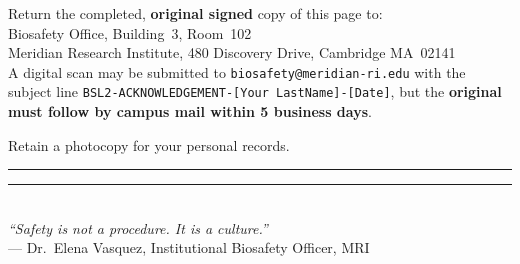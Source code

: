 \vspace{12pt}
\begin{infobox}
\small
Return the completed, \textbf{original signed} copy of this page to:\\
\medskip
\hspace{1em} Biosafety Office, Building~3, Room~102\\
\hspace{1em} Meridian Research Institute, 480 Discovery Drive, Cambridge MA~02141\\
\medskip
A digital scan may be submitted to \texttt{biosafety@meridian-ri.edu} with the
subject line \texttt{BSL2-ACKNOWLEDGEMENT-[Your LastName]-[Date]}, but the
\textbf{original must follow by campus mail within 5 business days}.

Retain a photocopy for your personal records.
\end{infobox}

\vspace{14pt}
\begin{center}
\color{BSLrule}\small\sffamily
\rule{0.4\linewidth}{0.5pt}\quad\biosymbol\quad\rule{0.4\linewidth}{0.5pt}\\[6pt]
\textit{``Safety is not a procedure. It is a culture.''}\\[2pt]
\footnotesize --- Dr.\ Elena Vasquez, Institutional Biosafety Officer, MRI
\end{center}
